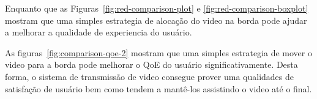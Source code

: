 Enquanto que as Figuras~\ref{fig:red-comparison-plot} e \ref{fig:red-comparison-boxplot} mostram que uma simples estrategia de alocação do video na borda pode ajudar a melhorar a qualidade de experiencia do usuário.

As figuras~\ref{fig:comparison-qoe-2} mostram que uma simples estrategia de mover o video para a borda pode melhorar o QoE do usuário significativamente. Desta forma, o sistema de transmissão de video consegue  prover uma qualidades de satisfação de usuário bem como tendem a mantê-los assistindo o video até o final.